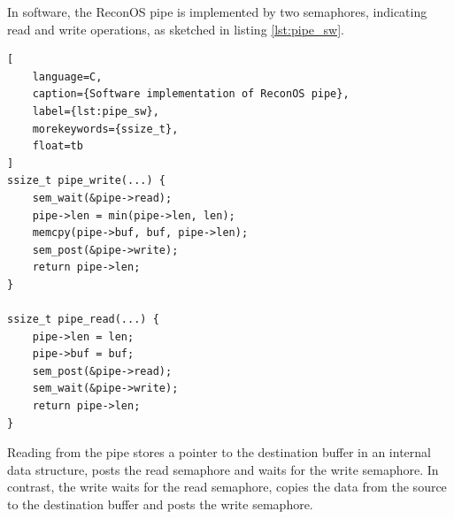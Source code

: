 In software, the ReconOS pipe is implemented by two semaphores, indicating
read and write operations, as sketched in listing \ref{lst:pipe_sw}.
\begin{lstlisting}[
	language=C,
	caption={Software implementation of ReconOS pipe},
	label={lst:pipe_sw},
	morekeywords={ssize_t},
	float=tb
]
ssize_t pipe_write(...) {
	sem_wait(&pipe->read);
	pipe->len = min(pipe->len, len);
	memcpy(pipe->buf, buf, pipe->len);
	sem_post(&pipe->write);
	return pipe->len;
}

ssize_t pipe_read(...) {
	pipe->len = len;
	pipe->buf = buf;
	sem_post(&pipe->read);
	sem_wait(&pipe->write);
	return pipe->len;
}
\end{lstlisting}
Reading from the pipe stores a pointer to the destination buffer in an
internal data structure, posts the read semaphore and waits for the write
semaphore. In contrast, the write waits for the read semaphore, copies the
data from the source to the destination buffer and posts the write semaphore.

